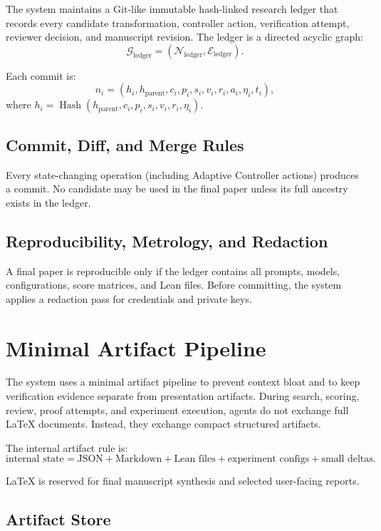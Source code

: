 \documentclass[11pt]{article}
\newcommand{\Hash}{\operatorname{Hash}}
\begin{document}
The system maintains a Git-like immutable hash-linked research ledger that records every candidate transformation, controller action, verification attempt, reviewer decision, and manuscript revision. The ledger is a directed acyclic graph:
$$
\mathcal{G}_{\text{ledger}} = (\mathcal{N}_{\text{ledger}},\mathcal{E}_{\text{ledger}}).
$$

Each commit is:
$$
n_i = (h_i,h_{\text{parent}},c_i,p_i,s_i,v_i,r_i,a_i,\eta_i,t_i),
$$
where $h_i = \Hash(h_{\text{parent}},c_i,p_i,s_i,v_i,r_i,\eta_i)$.

\subsection{Commit, Diff, and Merge Rules}
Every state-changing operation (including Adaptive Controller actions) produces a commit. No candidate may be used in the final paper unless its full ancestry exists in the ledger. 

\subsection{Reproducibility, Metrology, and Redaction}
A final paper is reproducible only if the ledger contains all prompts, models, configurations, score matrices, and Lean files. Before committing, the system applies a redaction pass for credentials and private keys. 

\section{Minimal Artifact Pipeline}

The system uses a minimal artifact pipeline to prevent context bloat and to keep verification evidence separate from presentation artifacts. During search, scoring, review, proof attempts, and experiment execution, agents do not exchange full LaTeX documents. Instead, they exchange compact structured artifacts.

The internal artifact rule is:
$$
\text{internal state} = \text{JSON} + \text{Markdown} + \text{Lean files} + \text{experiment configs} + \text{small deltas}.
$$

LaTeX is reserved for final manuscript synthesis and selected user-facing reports.

\subsection{Artifact Store}
\end{document}

